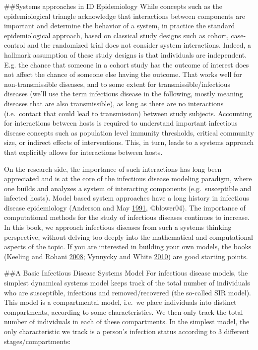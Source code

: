 \documentclass[]{book}
\theoremstyle{definition}
\theoremstyle{definition}
\theoremstyle{definition}
\theoremstyle{remark}
\begin{document}
\#\#Systems approaches in ID Epidemiology While concepts such as the
epidemiological triangle acknowledge that interactions between
components are important and determine the behavior of a system, in
practice the standard epidemiological approach, based on classical study
designs such as cohort, case-control and the randomized trial does not
consider system interactions. Indeed, a hallmark assumption of these
study designs is that individuals are independent. E.g. the chance that
someone in a cohort study has the outcome of interest does not affect
the chance of someone else having the outcome. That works well for
non-transmissible diseases, and to some extent for
transmissible/infectious diseases (we'll use the term infectious disease
in the following, mostly meaning diseases that are also transmissible),
as long as there are no interactions (i.e.~contact that could lead to
transmission) between study subjects. Accounting for interactions
between hosts is required to understand important infectious disease
concepts such as population level immunity thresholds, critical
community size, or indirect effects of interventions. This, in turn,
leads to a systems approach that explicitly allows for interactions
between hosts.

On the research side, the importance of such interactions has long been
appreciated and is at the core of the infectious disease modeling
paradigm, where one builds and analyzes a system of interacting
components (e.g.~susceptible and infected hosts). Model based system
approaches have a long history in infectious disease epidemiology
(Anderson and May \protect\hyperlink{ref-anderson91}{1991}, @blower04).
The importance of computational methods for the study of infectious
diseases continues to increase. In this book, we approach infectious
diseases from such a systems thinking perspective, without delving too
deeply into the mathematical and computational aspects of the topic. If
you are interested in building your own models, the books (Keeling and
Rohani \protect\hyperlink{ref-keeling08}{2008}; Vynnycky and White
\protect\hyperlink{ref-vynnycky10}{2010}) are good starting points.

\#\#A Basic Infectious Disease Systems Model For infectious disease
models, the simplest dynamical systems model keeps track of the total
number of individuals who are susceptible, infectious and
removed/recovered (the so-called SIR model). This model is a
compartmental model, i.e.~we place individuals into distinct
compartments, according to some characteristics. We then only track the
total number of individuals in each of these compartments. In the
simplest model, the only characteristic we track is a person's infection
status according to 3 different stages/compartments:
\end{document}
